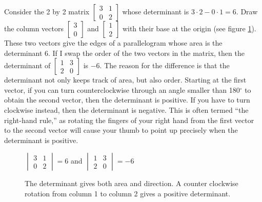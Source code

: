 Consider the 2 by 2 matrix $\begin{bmatrix}3&1\\0&2\end{bmatrix}$ whose determinant is $3\cdot 2-0\cdot 1=6$. Draw the column vectors $\begin{bmatrix}3\\0\end{bmatrix}$ and $\begin{bmatrix}1\\2\end{bmatrix}$ with their base at the origin (see figure \ref{detfig}). 
These two vectors give the edges of a parallelogram whose area is the determinant $6$.  If I swap the order of the two vectors in the matrix, then the determinant of $\begin{bmatrix}1&3\\2&0\end{bmatrix}$ is $-6$.  The reason for the difference is that the determinant not only keeps track of area, but also order. Starting at the first vector, if you can turn counterclockwise through an angle smaller than 180$^\circ$ to obtain the second vector, then the determinant is positive.  If you have to turn clockwise instead, then the determinant is negative.  This is often termed ``the right-hand rule,'' as rotating the fingers of your right hand from the first vector to the second vector will cause your thumb to point up precisely when the determinant is positive.
\begin{figure}[h]
\begin{center}

\vspace{2pt}
$\begin{vmatrix}{3}&{1}\\{0}&{2}\end{vmatrix}=6$ and $\begin{vmatrix}{1}&{3}\\{2}&0\end{vmatrix}=-6$
\end{center}
\caption{The determinant gives both area and direction. A counter clockwise rotation from column 1 to column 2 gives a positive determinant.\label{detfig}}
\end{figure}

